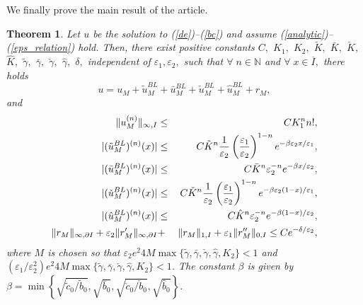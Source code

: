 \documentclass[12pt]{article}
\newtheorem{theorem}{Theorem}
\begin{document}
We finally prove the main result of the article.

\begin{theorem}\label{thm:main}
Let $u$ be the solution to (\ref{de})--(\ref{bc}) and assume (\ref{analytic})--(\ref{eps_relation}) hold. Then, there
exist positive constants $C,$ $K_1,$ $K_2,$ $\tilde{K},$ $\bar{K},$ $\check{K},$ $\hat{K},$ $\tilde{\gamma},$ $\bar{\gamma},$ $\check{\gamma},$ $\hat{\gamma},$ $\delta ,$ independent of 
$\varepsilon_1, \varepsilon_2,$ such that $\forall \; n \in \mathbb{N}$ and $\forall \; x \in \overline{I},$ there holds
\begin{equation*}
u = u_M + \tilde{u}_M^{BL} + \bar{u}_M^{BL} + \check{u}_M^{BL} + \hat{u}_M^{BL} + r_M,
\end{equation*}
and
\begin{eqnarray*}
\Vert u_M^{(n)} \Vert_{\infty, I} &\leq& C K_1^n n! ,\\
 \vert (\tilde{u}^{BL}_{M})^{(n)}(x) \vert &\leq& C \tilde{K}^n  \frac{1}{\varepsilon _{2}}\left( \frac{%
\varepsilon _{1}}{\varepsilon _{2}}\right) ^{1-n}e^{-\beta \varepsilon
_{2}x/\varepsilon _{1}},\\
 \vert (\bar{u}_{M}^{BL})^{(n)}(x) \vert &\leq& C \bar{K}^n\varepsilon _{2}^{-n}e^{-\beta x/\varepsilon _{2}},\\
\vert (\check{u}_{M}^{BL})^{(n)}(x) \vert &\leq& C \check{K}^n \frac{1}{\varepsilon _{2}}%
\left( \frac{\varepsilon _{1}}{\varepsilon _{2}}\right)
^{1-n}e^{-\beta \varepsilon _{2}(1-x)/\varepsilon _{1}} , \\
\vert (\hat{u}_{M}^{BL})^{(n)}(x) \vert &\leq& C \hat{K}^n \varepsilon
_{2}^{-n}e^{-\beta (1-x)/\varepsilon _{2}} , \\
\Vert r_M \Vert_{\infty,\partial I}+\varepsilon_2 \Vert r'_M \Vert_{\infty,\partial I} &+& \Vert r_M \Vert_{1, I} +
\varepsilon_1 \Vert r''_M \Vert_{0, I} \leq C e^{-\delta / \varepsilon _{2}},
\end{eqnarray*}%
where $M$ is chosen so that $\varepsilon_2 e^2 4M \max \{ \tilde{\gamma}, \bar{\gamma}, \check{\gamma}, \hat{\gamma}, K_2 \} < 1$ and
$(\varepsilon_1 / \varepsilon_2^2) e^2 4M \max \{ \tilde{\gamma}, \bar{\gamma}, \check{\gamma}, \hat{\gamma}, K_2 \} < 1$. The constant $\beta$ is given by $\beta = \min \left\{ \sqrt{\tilde{c}_{0} / \tilde{b}_{0}},\sqrt{\bar{b}_{0}} ,
\sqrt{\check{c}_{0} / \check{b}_{0}},\sqrt{\hat{b}_{0}} \right\}$.
\end{theorem}
%
\end{document}
